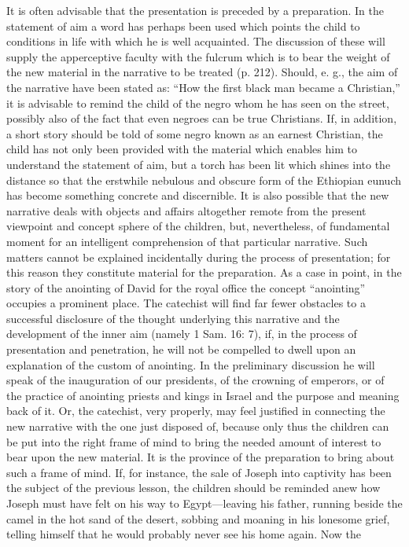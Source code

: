 It is often advisable that the presentation is preceded by a preparation. In the statement of aim a word has perhaps been used which points the child to conditions in life with which he is well acquainted. The discussion of these will supply the apperceptive faculty with the fulcrum which is to bear the weight of the new material in the narrative to be treated (p. 212). Should, e. g., the aim of the narrative have been stated as: “How the first black man became a Christian,” it is advisable to remind the child of the negro whom he has seen on the street, possibly also of the fact that even negroes can be true Christians. If, in addition, a short story should be told of some negro known as an earnest Christian, the child has not only been
provided with the material which enables him to understand the statement of aim, but a torch has been lit which shines into the distance so that the erstwhile nebulous and obscure form of the Ethiopian eunuch has become something concrete and discernible. It is also possible that the new narrative deals with objects and affairs altogether remote from the present viewpoint and concept sphere of the children, but, nevertheless, of fundamental moment for an intelligent comprehension of that particular narrative. Such matters cannot be explained incidentally during the process of presentation; for this reason they constitute material for the preparation. As a case in point, in the story of the anointing of David for the royal office the concept “anointing” occupies a prominent place. The catechist will find far fewer obstacles to a successful disclosure of the thought underlying this narrative and the development of the inner aim (namely 1 Sam. 16: 7), if, in the process of presentation and penetration, he will not be compelled to dwell upon an explanation of the custom of anointing. In the preliminary discussion he will speak of the inauguration of our presidents, of the crowning of emperors, or of the practice of anointing priests and kings in Israel and the purpose and meaning back of it. Or, the catechist, very properly, may feel justified in connecting the new narrative with the one just disposed of, because only thus the children can be put into the right frame of mind to bring the needed amount of interest to bear upon the new material. It is the province of the preparation to bring about such a frame of mind. If, for instance, the sale of Joseph into captivity has been the subject of the previous lesson, the children should be reminded anew how Joseph must have felt on his way to Egypt—leaving his father, running beside the camel in the hot sand of the desert, sobbing and moaning in his lonesome grief, telling himself that he would probably never see his home again. Now the
